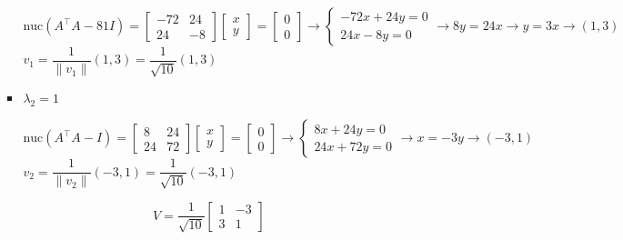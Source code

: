 \begin{enumerate}[label=\color{red}\textbf{\arabic*)}]
\begin{enumerate}[label=\color{red}\textbf{\alph*)}]
\begin{itemize}[label=\textbullet]
            \[
            \mathrm{nuc}(A^\intercal A-81I)=\begin{bmatrix} 
                -72 & 24\\
                24 & -8
            \end{bmatrix}\begin{bmatrix} 
            x\\y 
            \end{bmatrix}  =\begin{bmatrix} 
            0\\0 
            \end{bmatrix} \longrightarrow \begin{cases}
                -72x+24y=0\\
                24x-8y=0
            \end{cases}\longrightarrow 8y=24x\longrightarrow y=3x\longrightarrow (1,3)
            \] 
            $v_1=\dfrac{1}{\|v_1\|}(1,3)=\dfrac{1}{\sqrt{10} }(1,3)$
        \item $\lambda_2=1$

            \[
            \mathrm{nuc}(A^\intercal A-I)=\begin{bmatrix} 
                8 & 24\\
                24 & 72
            \end{bmatrix} \begin{bmatrix} 
            x\\ y 
            \end{bmatrix} =\begin{bmatrix} 
            0\\0 
            \end{bmatrix} \longrightarrow \begin{cases}
                8x+24y=0\\
                24x+72y=0
            \end{cases}\longrightarrow x=-3y\longrightarrow (-3,1)
            \] 
            $v_2=\dfrac{1}{\|v_2\|}(-3,1)=\dfrac{1}{\sqrt{10} }(-3,1)$
    \end{itemize}   
    \[
    V=\dfrac{1}{\sqrt{10} }\begin{bmatrix} 
        1 & -3\\
        3 & 1
    \end{bmatrix} 
    \]


\end{enumerate}
\end{enumerate}
